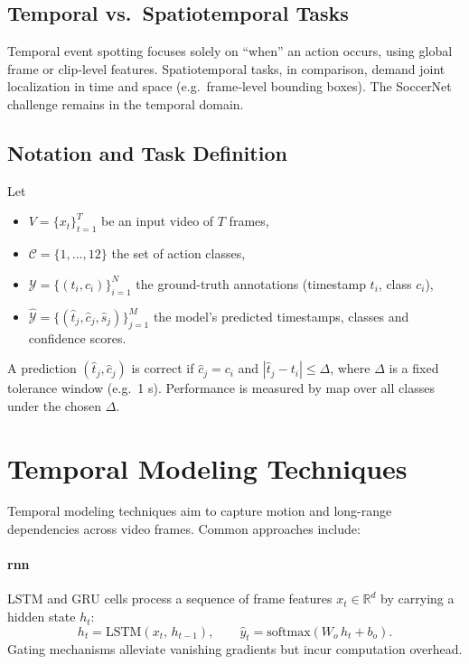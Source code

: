 \subsection{Temporal vs.\ Spatiotemporal Tasks}
Temporal event spotting focuses solely on “when” an action occurs, using global frame or clip‐level features. Spatiotemporal tasks, in comparison, demand joint localization in time and space (e.g.\ frame‐level bounding boxes). The SoccerNet challenge remains in the temporal domain.

\subsection{Notation and Task Definition}
Let
\begin{itemize}
  \item $V=\{x_t\}_{t=1}^T$ be an input video of $T$ frames,
  \item $\mathcal{C}=\{1,\dots,12\}$ the set of action classes,
  \item $\mathcal{Y}=\{(t_i,c_i)\}_{i=1}^N$ the ground-truth annotations (timestamp $t_i$, class $c_i$),
  \item $\hat{\mathcal{Y}}=\{(\hat t_j,\hat c_j,\hat s_j)\}_{j=1}^M$ the model's predicted timestamps, classes and confidence scores.
\end{itemize}
A prediction $(\hat t_j,\hat c_j)$ is correct if $\hat c_j=c_i$ and $|\hat t_j - t_i|\le\Delta$, where $\Delta$ is a fixed tolerance window (e.g.\ 1 s). Performance is measured by \acrfull{map} over all classes under the chosen $\Delta$.
\section{Temporal Modeling Techniques}
\label{sec:temporal_models}

Temporal modeling techniques aim to capture motion and long-range dependencies across video frames. Common approaches include: 

\paragraph{\acrfull{rnn}}  
LSTM and GRU cells process a sequence of frame features \(x_t\in\mathbb{R}^d\) by carrying a hidden state \(h_t\):
\[
h_t = \mathrm{LSTM}(x_t,\,h_{t-1}), 
\qquad
\hat y_t = \mathrm{softmax}(W_o\,h_t + b_o).
\]
Gating mechanisms alleviate vanishing gradients but incur computation overhead.

